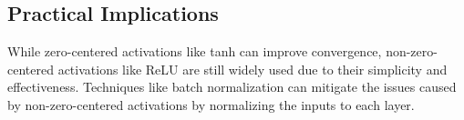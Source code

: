 \begin{notechapter}
\subsection{Practical Implications}
While zero-centered activations like tanh can improve convergence, non-zero-centered 
activations like ReLU are still widely used due to their simplicity and effectiveness. 
Techniques like batch normalization can mitigate the issues caused by non-zero-centered 
activations by normalizing the inputs to each layer.
\end{notechapter}
